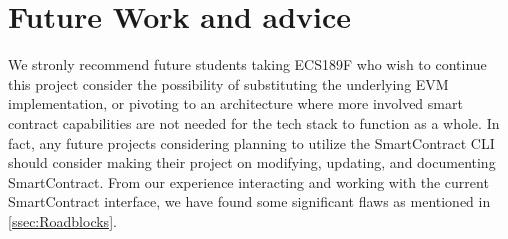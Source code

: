 \section{Future Work and advice}

We stronly recommend future students taking ECS189F who wish to continue this project consider the possibility of substituting the underlying EVM implementation, or pivoting to an architecture where more involved smart contract capabilities are not needed for the tech stack to function as a whole.
In fact, any future projects considering planning to utilize the SmartContract CLI should consider
making their project on modifying, updating, and documenting SmartContract.
From our experience interacting and working with the current SmartContract interface, we have found
some significant flaws as mentioned in \autoref{ssec:Roadblocks}.
